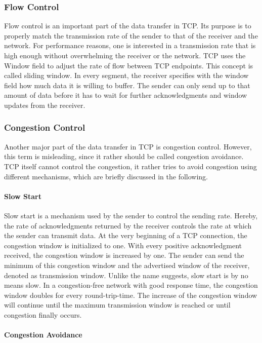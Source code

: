 \subsubsection{Flow Control}

Flow control is an important part of the data transfer in TCP. Its purpose is to properly match the transmission rate of the sender to that of the receiver and the network. For performance reasons, one is interested in a transmission rate that is high enough without overwhelming the receiver or the network. TCP uses the Window field to adjust the rate of flow between TCP endpoints. This concept is called sliding window. In every segment, the receiver specifies with the window field how much data it is willing to buffer. The sender can only send up to that amount of data before it has to wait for further acknowledgments and window updates from the receiver. 

\subsubsection{Congestion Control}

Another major part of the data transfer in TCP is congestion control. However, this term is misleading, since it rather should be called congestion avoidance. TCP itself cannot control the congestion, it rather tries to avoid congestion using different mechanisms, which are briefly discussed in the following. 

\paragraph{Slow Start}

Slow start is a mechanism used by the sender to control the sending rate. Hereby, the rate of acknowledgments returned by the receiver controls the rate at which the sender can transmit data. At the very beginning of a TCP connection, the congestion window is initialized to one. With every positive acknowledgment received, the congestion window is increased by one. The sender can send the minimum of this congestion window and the advertised window of the receiver, denoted as transmission window. Unlike the name suggests, slow start is by no means slow. In a congestion-free network with good response time, the congestion window doubles for every round-trip-time. The increase of the congestion window will continue until the maximum transmission window is reached or until congestion finally occurs.

\paragraph{Congestion Avoidance}

